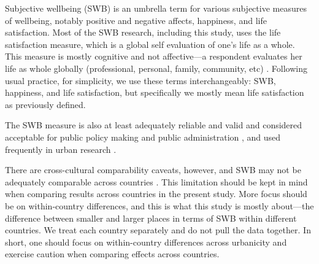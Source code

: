 \documentclass[11pt, letterpaper]{article}
\begin{document}
   

Subjective wellbeing (SWB) is an umbrella term for various subjective measures
of wellbeing, notably positive and negative affects, happiness, and life
satisfaction. Most of the SWB research, including this study, uses the life
satisfaction measure, which is a global self evaluation of one's life as a
whole. This measure is mostly cognitive and not affective---a respondent
evaluates her life as whole globally (professional, personal, family, community,
etc) %
 \citep[for a review see][]{diener09}.
Following usual practice, for simplicity, we use these terms interchangeably: SWB, happiness, and life satisfaction, but specifically we mostly mean life satisfaction as previously defined.

The SWB measure is also at least adequately reliable and valid and considered
acceptable for public policy making and public administration
\citep{diener09,stiglitz09al}, and used frequently in urban research \citep[e.g.,][]{moeinaddini20,mouratidis19,wang19,anon17-cities-oslo,ma17,wkeziak16,valente16,chen15}.

There are cross-cultural comparability caveats, however, and SWB may not be
adequately comparable across countries \citep{kahneman99,diener09}. This limitation should be kept in mind when comparing results across countries in the present study. More focus should be on within-country differences, and this is what this study is mostly about---the difference between smaller and larger places in terms of SWB
within different countries. We treat each country separately and do not pull the data together. In short, one should focus on within-country differences across urbanicity and exercise caution when comparing effects across countries. 

\end{document}
